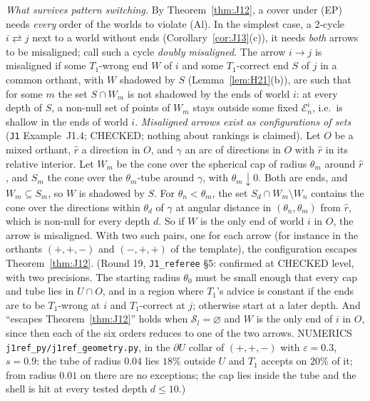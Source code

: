 \documentclass[11pt]{article}
\theoremstyle{definition}
\theoremstyle{remark}
\newcommand{\src}[1]{\texttt{#1}}
\begin{document}
\emph{What survives pattern switching.} By Theorem~\ref{thm:J12}, a cover under (EP) needs \emph{every} order of the worlds to violate (Al). In the simplest case, a $2$-cycle $i\rightleftarrows j$ next to a world without ends (Corollary~\ref{cor:J13}(c)), it needs \emph{both} arrows to be misaligned; call such a cycle \emph{doubly misaligned}. The arrow $i\to j$ is misaligned if some $T_1$-wrong end $W$ of $i$ and some $T_1$-correct end $S$ of $j$ in a common orthant, with $W$ shadowed by $S$ (Lemma~\ref{lem:H21}(b)), are such that for some $m$ the set $S\cap W_m$ is not shadowed by the ends of world $i$: at every depth of $S$, a non-null set of points of $W_m$ stays outside some fixed $\mathcal E^i_n$, i.e.\ is shallow in the ends of world $i$. \emph{Misaligned arrows exist as configurations of sets} (\src{J1} Example~J1.4; CHECKED; nothing about rankings is claimed). Let $O$ be a mixed orthant, $\hat r$ a direction in $O$, and $\gamma$ an arc of directions in $O$ with $\hat r$ in its relative interior. Let $W_m$ be the cone over the spherical cap of radius $\theta_m$ around $\hat r$, and $S_m$ the cone over the $\theta_m$-tube around $\gamma$, with $\theta_m\downarrow0$. Both are ends, and $W_m\subseteq S_m$, so $W$ is shadowed by $S$. For $\theta_n<\theta_m$, the set $S_d\cap W_m\setminus W_n$ contains the cone over the directions within $\theta_d$ of $\gamma$ at angular distance in $(\theta_n,\theta_m)$ from $\hat r$, which is non-null for every depth $d$. So if $W$ is the only end of world $i$ in $O$, the arrow is misaligned. With two such pairs, one for each arrow (for instance in the orthants $(+,+,-)$ and $(-,+,+)$ of the template), the configuration escapes Theorem~\ref{thm:J12}. (Round 19, \src{J1\_referee} \S5: confirmed at CHECKED level, with two precisions. The starting radius $\theta_0$ must be small enough that every cap and tube lies in $U\cap O$, and in a region where $T_1$'s advice is constant if the ends are to be $T_1$-wrong at $i$ and $T_1$-correct at $j$; otherwise start at a later depth. And ``escapes Theorem~\ref{thm:J12}'' holds when $\mathcal S_l=\varnothing$ and $W$ is the only end of $i$ in $O$, since then each of the six orders reduces to one of the two arrows. NUMERICS \src{j1ref\_py/j1ref\_geometry.py}, in the $\partial U$ collar of $(+,+,-)$ with $\varepsilon=0.3$, $s=0.9$: the tube of radius $0.04$ lies $18\%$ outside $U$ and $T_1$ accepts on $20\%$ of it; from radius $0.01$ on there are no exceptions; the cap lies inside the tube and the shell is hit at every tested depth $d\le10$.)
\end{document}
